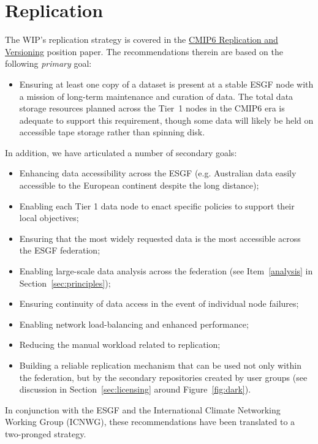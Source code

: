 \documentclass[gmd,manuscript]{copernicus}
\newcommand{\figref}[1] {\mbox{Figure   \ref{fig:#1}}}
\newcommand{\secref}[1] {\mbox{Section  \ref{sec:#1}}}
\begin{document}
\section{Replication}
\label{sec:replica}

The WIP's replication strategy is covered in the
\href{https://goo.gl/Bs4Qou}{CMIP6 Replication and Versioning}
position paper. The recommendations therein are based on the following
\emph{primary} goal:

\begin{itemize}
\item Ensuring at least one copy of a dataset is present at a stable
ESGF node with a mission of long-term maintenance and curation of
data. The total data storage resources planned across
  the Tier~1 nodes in the CMIP6 era is adequate to support this
  requirement, though some data will likely be held on accessible tape
  storage rather than spinning disk.
\end{itemize}

In addition, we have articulated a number of secondary goals:

\begin{itemize}
\item Enhancing data accessibility across the ESGF (e.g. Australian
  data easily accessible to the European continent despite the long
  distance);
\item Enabling each Tier 1 data node to enact specific policies to support their
  local objectives;
\item Ensuring that the most widely requested data is the most
  accessible across the ESGF federation;
\item Enabling large-scale data analysis across the federation (see
  Item~\ref{analysis} in \secref{principles});
\item Ensuring continuity of data access in the event of individual node
  failures;
\item Enabling network load-balancing and enhanced performance;
\item Reducing the manual workload related to replication;
\item Building a reliable replication mechanism that can be used not
  only within the federation, but by the secondary repositories
  created by user groups (see discussion in \secref{licensing} around
  \figref{dark}).
\end{itemize}

In conjunction with the ESGF and the International Climate Networking
Working Group (ICNWG), these recommendations have been translated to a
two-pronged strategy.
\end{document}
